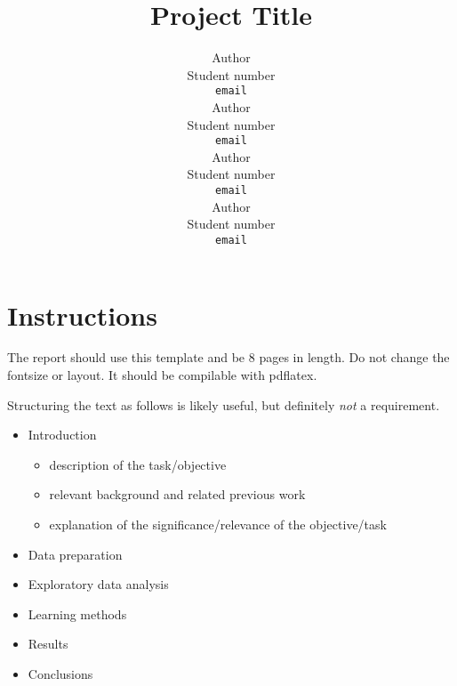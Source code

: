 \documentclass{article}
\title{Project Title}
\author{
  Author\\
  Student number\\
  \texttt{email} \\
  \And
  Author\\
  Student number\\
  \texttt{email} \\
 \And
  Author\\
  Student number\\
  \texttt{email} \\
 \And
  Author\\
  Student number\\
  \texttt{email}\\
}
\begin{document}
\maketitle

\begin{abstract}
 \blindtext[1]
\end{abstract}

\section{Instructions}

The report should use this template and be 8 pages in length. Do not change the fontsize or layout. It should be compilable with pdflatex.

Structuring the text as follows is likely useful, but definitely
\emph{not} a requirement.

\begin{itemize}
\item Introduction
  \begin{itemize}
  \item description of the task/objective
  \item relevant background and related previous work
  \item explanation of the significance/relevance of the objective/task
  \end{itemize}
\item Data preparation
\item Exploratory data analysis
\item Learning methods
\item Results
\item Conclusions
\end{itemize}
\end{document}
